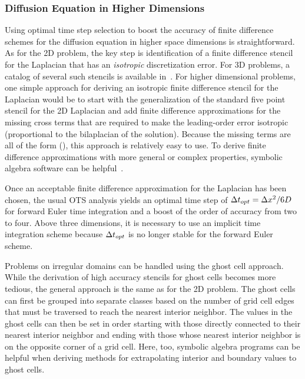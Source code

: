 \documentclass[oneeqnum,onefignum,onetabnum,onethmnum]{siamltex}
\begin{document}
\subsubsection{Diffusion Equation in Higher Dimensions}
Using optimal time step selection to boost the accuracy of finite difference
schemes for the diffusion equation in higher space dimensions is 
straightforward.  As for the 2D problem, the key step is identification of a 
finite difference stencil for the Laplacian that has an \emph{isotropic} 
discretization error.  For 3D problems, a catalog of several such stencils is 
available in~\cite{patra_2005}.   For higher dimensional problems, one simple
approach for deriving an isotropic finite difference stencil for the Laplacian
would be to start with the generalization of the standard five point stencil
for the 2D Laplacian and add finite difference approximations for the missing 
cross terms that are required to make the leading-order error isotropic 
(\ie proportional to the bilaplacian of the solution).  Because the missing 
terms are all of the form 
\beq
{} \left(\right),
\eeq
this approach is relatively easy to use.  To derive finite difference 
approximations with more general or complex properties, symbolic algebra 
software can be helpful~\cite{patra_2005, gupta_1998}.  

Once an acceptable finite difference approximation for the Laplacian has been 
chosen, the usual OTS analysis yields an optimal time step of 
$\Delta t_{opt} = \Delta x^2/6D$ for forward Euler time integration and a boost of the 
order of accuracy from two to four.  Above three dimensions, it is necessary 
to use an implicit time integration scheme because $\Delta t_{opt}$ is no longer 
stable for the forward Euler scheme.

Problems on irregular domains can be handled using the ghost cell approach. 
While the derivation of high accuracy stencils for ghost cells becomes more
tedious, the general approach is the same as for the 2D problem.  The ghost 
cells can first be grouped into separate classes based on the number of 
grid cell edges that must be traversed to reach the nearest interior neighbor.
The values in the ghost cells can then be set in order starting with those 
directly connected to their nearest interior neighbor and ending with those 
whose nearest interior neighbor is on the opposite corner of a grid cell.
Here, too, symbolic algebra programs can be helpful when deriving methods for 
extrapolating interior and boundary values to ghost cells.
\end{document}
